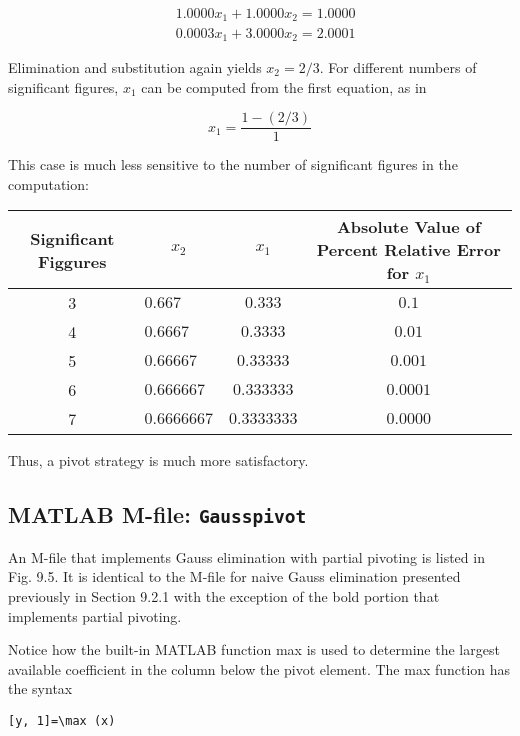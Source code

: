 \documentclass[../main.tex]{subfiles}
\begin{document}
\begin{example}
    $$
    \begin{aligned}
    &1.0000 x_{1}+1.0000 x_{2}=1.0000 \\
    &0.0003 x_{1}+3.0000 x_{2}=2.0001
    \end{aligned}
    $$
    \bigskip

    Elimination and substitution again yields $x_{2}=2 / 3$. For different numbers of significant figures, $x_{1}$ can be computed from the first equation, as in
    
    $$
    x_{1}=\frac{1-(2 / 3)}{1}
    $$

    This case is much less sensitive to the number of significant figures in the computation:
    \bigskip

    \begin{tabular}{clcc} 
    Significant Figgures & \multicolumn{1}{c}{$x_{2}$} & \multicolumn{1}{c}{$x_{1}$} & \multicolumn{1}{c}{ Absolute Value of Percent Relative Error for $x_{1}$} \\
    \hline 3 & $0.667$ & $0.333$ & $0.1$ \\
    4 & $0.6667$ & $0.3333$ & $0.01$ \\
    5 & $0.66667$ & $0.33333$ & $0.001$ \\
    6 & $0.666667$ & $0.333333$ & $0.0001$ \\
    7 & $0.6666667$ & $0.3333333$ & $0.0000$
    \end{tabular}
    \bigskip

    Thus, a pivot strategy is much more satisfactory.

\end{example}

\subsection{MATLAB M-file: \texttt{Gausspivot}}

An M-file that implements Gauss elimination with partial pivoting is listed in Fig. 9.5. It is identical to the M-file for naive Gauss elimination presented previously in Section 9.2.1 with the exception of the bold portion that implements partial pivoting.

Notice how the built-in MATLAB function max is used to determine the largest available coefficient in the column below the pivot element. The max function has the syntax

\begin{lstlisting}[numbers=none,frame=none]
    [y, 1]=\max (x)
\end{lstlisting}
\end{document}
